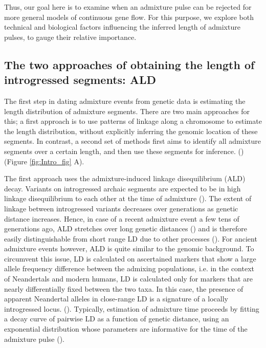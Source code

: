 \documentclass[]{article}
\begin{document}
Thus, our goal here is to examine when an admixture pulse can be rejected for more general models of continuous gene flow.  For this purpose, we explore both technical and biological factors influencing the inferred length of admixture pulses, to gauge their relative importance.

\subsection{The two approaches of obtaining the length of introgressed
segments:
ALD}\label{the-two-approaches-of-obtaining-the-length-of-introgressed-segments-ald}

The first step in dating admixture events from genetic data is estimating the length distribution of admixture segments.  There are two main approaches for this; a first approach is to use patterns of linkage along a chromosome to estimate the length distribution, without explicitly inferring the genomic location of these segments. In contrast, a second set of methods first aims to identify all admixture segments over a certain length, and then use these segments for inference. 
(\cite{chimusa_dating_2018}) (Figure \ref{fig:Intro_fig} A).

The first approach uses the admixture-induced linkage disequilibrium
(ALD) decay. Variants on introgressed archaic segments are
expected to be in high linkage disequilibrium to each other at the time
of admixture
(\cite{chakraborty_admixture_1988,stephens_mapping_1994,wall_detecting_2000}). The extent of linkage between introgressed variants decreases over generations as genetic distance increases. Hence, in case of a recent
admixture event a few tens of generations ago, ALD stretches  over long genetic distances
(\cite{patterson_methods_2004}) and is therefore easily distinguishable
from short range LD due to other processes (\cite{moorjani_history_2011}). For ancient
admixture events however, ALD is quite similar to the genomic background. To circumvent this issue, LD is calculated on ascertained markers that show a large allele frequency difference between the admixing populations, i.e. in the context of Neandertals and modern humans, LD is calculated only for markers that are nearly differentially fixed between the two taxa. In this case, the presence of apparent Neandertal alleles in close-range LD is a signature of a locally introgressed locus.
(\cite{sankararaman_date_2012}). Typically, estimation of admixture time proceeds by fitting a decay curve of pairwise LD as a function of
genetic distance, using an exponential distribution whose parameters are informative for the time of the admixture pulse
(\cite{moorjani_history_2011,loh_inferring_2013}).
\end{document}
